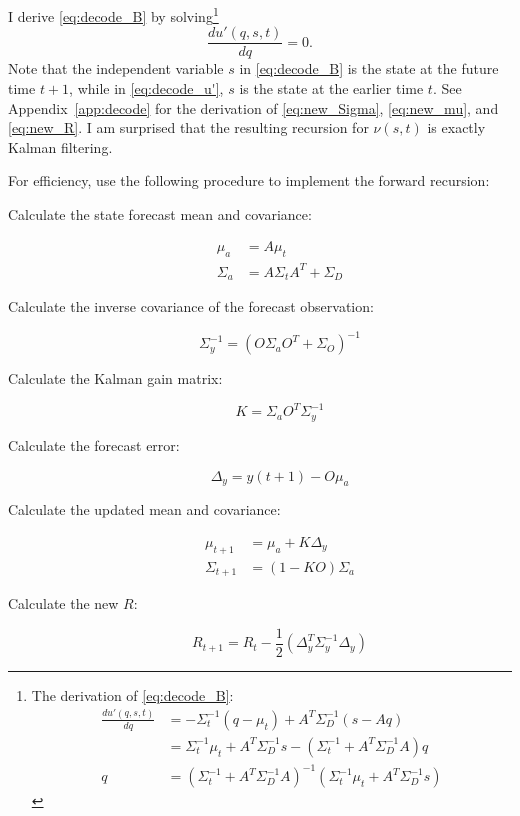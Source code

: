 \documentclass[12pt]{article}
\newcommand{\ti}[2]{{#1}{(#2)}}                         %
\begin{document}
I derive \eqref{eq:decode_B} by
solving\footnote{The derivation of \eqref{eq:decode_B}:
  \begin{align*}
    \frac{d u'(q,s,t)}{d q} &= -\Sigma_t^{-1}(q-\mu_t) + A^T \Sigma_D^{-1}
    (s - Aq) \\
    &= \Sigma_t^{-1}\mu_t + A^T \Sigma_D^{-1} s -(\Sigma_t^{-1} +
    A^T\Sigma_D^{-1}A)q \\
    q &= \left( \Sigma_t^{-1} + A^T\Sigma_D^{-1}A\right)^{-1} \left(
      \Sigma_t^{-1}\mu_t + A^T \Sigma_D^{-1} s \right)
  \end{align*}
}
\begin{equation*}
  \frac{d u'(q,s,t)}{d q} = 0.
\end{equation*}
Note that the independent variable $s$ in \eqref{eq:decode_B} is the
state at the future time $t+1$, while in \eqref{eq:decode_u'}, $s$ is
the state at the earlier time $t$.  See Appendix~\ref{app:decode} for
the derivation of \eqref{eq:new_Sigma}, \eqref{eq:new_mu}, and
\eqref{eq:new_R}.  I am surprised that the resulting recursion for
$\nu(s,t)$ is exactly Kalman filtering.

For efficiency, use the following procedure to implement the forward
recursion:
\begin{description}
\item[Calculate the state forecast mean and covariance:]
  \begin{align*}
    \mu_a &= A\mu_t \\
    \Sigma_a &= A \Sigma_t A^T + \Sigma_D
  \end{align*}
\item[Calculate the inverse covariance of the forecast observation:]
  \begin{equation*}
   \Sigma_y^{-1} = \left( O\Sigma_a O^T + \Sigma_O \right)^{-1}
  \end{equation*}
\item[Calculate the Kalman gain matrix:]
  \begin{equation*}
    K = \Sigma_a O^T \Sigma_y^{-1}
  \end{equation*}
\item[Calculate the forecast error:]
  \begin{equation*}
    \Delta_y = \ti{y}{t+1} - O\mu_a
  \end{equation*}
\item[Calculate the updated mean and covariance:]
  \begin{align}
    \label{eq:Sigma_alg}
    \mu_{t+1} &= \mu_a +  K\Delta_y \\
    \label{eq:mu_alg}
    \Sigma_{t+1} &= (1-KO)\Sigma_a
  \end{align}
\item[Calculate the new $R$:]
  \begin{equation}
    \label{eq:R_alg}
    R_{t+1} = R_t - \frac{1}{2} \left(\Delta_y^T \Sigma_y^{-1}
      \Delta_y \right)
  \end{equation}
\end{description}
\end{document}
